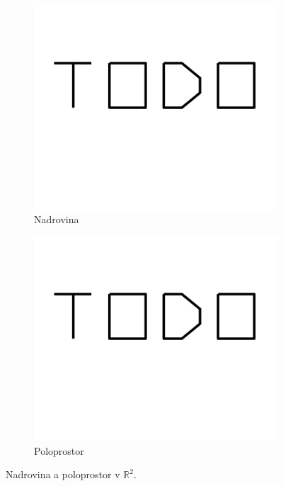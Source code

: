 \begin{figure}[h!]
    \centering
    \begin{subfigure}[b]{0.3\textwidth}
        \centering
        \includegraphics[width=\textwidth]{img/todo.png}   
        \caption{Nadrovina}
        \label{fig:hyperplane}
    \end{subfigure}

    \hfill

    \begin{subfigure}[b]{0.3\textwidth}
        \centering
        \includegraphics[width=\textwidth]{img/todo.png}   
        \caption{Poloprostor}
        \label{fig:halfspace}
    \end{subfigure}

    \caption{Nadrovina a poloprostor v $\mathbb{R}^2$.}
    \label{fig:hyperplane_halfspace}
\end{figure}


